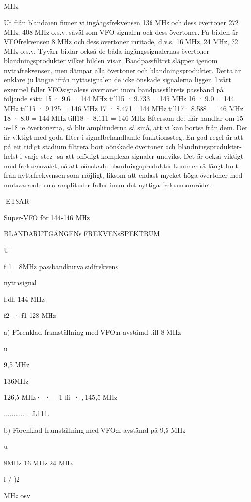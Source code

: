 MHz.

Ut från blandaren finner vi ingångsfrekvensen 136 MHz och dess övertoner 272
MHz, 408 MHz o.s.v. såväl som VFO-signalen och dess övertoner. På bilden är VFOfrekvensen 8 MHz och dess övertoner inritade, d.v.s. 16 MHz, 24 MHz, 32 MHz o.s.v.
Tyvärr bildar också de båda ingångssignalernas övertoner blandningsprodukter vilket bilden visar.
Bandpassfiltret släpper igenom nyttafrekvensen, men dämpar alla övertoner och
blandningsprodukter. Detta är enklare ju
längre ifrån nyttasignalen de icke önskade
signalerna ligger. l vårt exempel faller VFOsignalens övertoner inom bandpassfiltrets
passband på följande sätt:
15 · 9.6 = 144 MHz till15 · 9.733 = 146 MHz
16 · 9.0 = 144 MHz till16 · 9.125 = 146 MHz
17 · 8.471 =144 MHz till17· 8.588 = 146 MHz
18 · 8.0 = 144 MHz till18 · 8.111 = 146 MHz
Eftersom det här handlar om 15 :e-18 :e
övertonerna, så blir amplituderna så små, att
vi kan bortse från dem.
Det är viktigt med goda filter i signalbehandlande funktionssteg. En god regel är att
på ett tidigt stadium filtrera bort oönskade
övertoner och blandningsprodukter-helst i
varje steg -så att onödigt komplexa signaler
undviks. Det är också viktigt med frekvensvalet, så att oönskade blandningsprodukter
kommer så långt bort från nyttafrekvensen
som möjligt, liksom att endast mycket höga
övertoner med motsvarande små amplituder faller inom det nyttiga frekvensområdet

ETSAR

Super-VFO för 144-146 MHz

BLANDARUTGÄNGENs FREKVENsSPEKTRUM

U

f 1 =8MHz
passbandkurva
sidfrekvens

nyttasignal

f,df.
144 MHz

f2 -· f1
128 MHz

a) Förenklad framställning med VFO:n avstämd till 8 MHz

u

9,5 MHz

136MHz

126,5 MHz·--·----1 ffi--·-,.145,5 MHz

........... . .L111.

b) Förenklad framställning med VFO:n avstämd på 9,5 MHz

u

8MHz
16 MHz
24 MHz

l / )2

MHz osv


